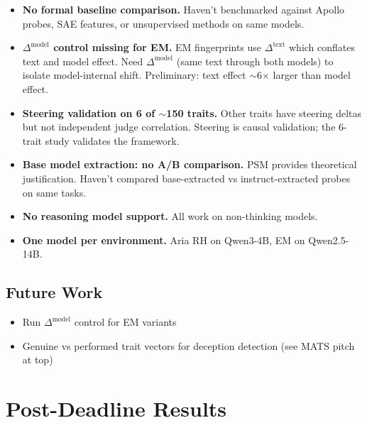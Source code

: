 \documentclass[11pt]{article}
\begin{document}
\begin{itemize}
  \item \textbf{No formal baseline comparison.} Haven't benchmarked against Apollo probes, SAE features, or unsupervised methods on same models.

  \item \textbf{$\Delta^{\text{model}}$ control missing for EM.} EM fingerprints use $\Delta^{\text{text}}$ which conflates text and model effect. Need $\Delta^{\text{model}}$ (same text through both models) to isolate model-internal shift. Preliminary: text effect $\sim$6$\times$ larger than model effect.

  \item \textbf{Steering validation on 6 of $\sim$150 traits.} Other traits have steering deltas but not independent judge correlation. Steering is causal validation; the 6-trait study validates the framework.

  \item \textbf{Base model extraction: no A/B comparison.} PSM provides theoretical justification. Haven't compared base-extracted vs instruct-extracted probes on same tasks.

  \item \textbf{No reasoning model support.} All work on non-thinking models.

  \item \textbf{One model per environment.} Aria RH on Qwen3-4B, EM on Qwen2.5-14B.
\end{itemize}

\subsection{Future Work}

\begin{itemize}
  \item Run $\Delta^{\text{model}}$ control for EM variants
  \item Genuine vs performed trait vectors for deception detection (see MATS pitch at top)
\end{itemize}


\section{Post-Deadline Results}
\end{document}
